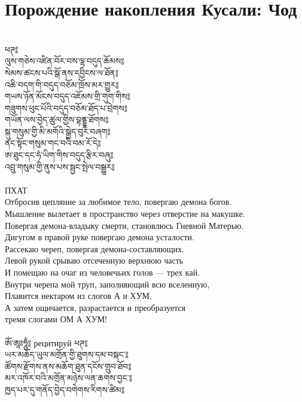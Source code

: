 \ru
\section{Порождение накопления Кусали: Чод}
\\
\ti
ཕཊ༔ \\
ལུས་གཅེས་འཛིན་བོར་བས་ལྷ་བདུད་ཆོམས༔\\
སེམས་ཚངས་པའི་སྒོ་ནས་དབྱིངས་ལ་ཐོན༔\\
འཆི་བདག་གི་བདུད་བཅོམ་ཁྲོས་མར་གྱུར༔\\
གཡས་ཉོན་མོངས་བདུད་འཇོམས་གྲི་གུག་གིས༔\\
གཟུགས་ཕུང་པོའི་བདུད་བཅོམ་ཐོད་པ་བྲེགས༔\\
གཡོན་ལས་བྱེད་ཚུལ་གྱིས་བྷནྡྷ་ཐོགས༔\\
སྐུ་གསུམ་གྱི་མི་མགོའི་སྒྱེད་བུར་བཞག༔\\
ནང་སྟོང་གསུམ་གང་བའི་བམ་རོ་དེ༔\\
ཨ་ཐུང་དང་ཧཾ་ཡིག་གིས་བདུད་རྩིར་བཞུ༔\\
འབྲུ་གསུམ་གྱི་ནུས་པས་སྦྱང་སྤེལ་བསྒྱུར༔\\
\\
\ru
ПХАТ\\
Отбросив цепляние за любимое тело, повергаю демона богов.\\
Мышление вылетает в пространство через отверстие на макушке.\\
Повергая демона-владыку смерти, становлюсь Гневной Матерью.\\
Дигугом в правой руке повергаю демона усталости.\\
Рассекаю череп, повергая демона-составляющих.\\
Левой рукой срываю отсеченную верхнюю часть\\
И помещаю на очаг из человечьих голов — трех кай.\\
Внутри черепа мой труп, заполняющий всю вселенную,\\
Плавится нектаром из слогов А и ХУМ,\\
А затем ощичается, разрастается и преобразуется\\
тремя слогами ОМ А ХУМ!\\
\\
\ti
ཨོཾ་ཨཱཿཧཱུྂ༔
\ru рецитируй
\newpage
\ti
ཕཊ༔\\
ཡར་མཆོད་ཡུལ་མགྲོན་གྱི་ཐུགས་དམ་བསྐང་༔\\
ཚོགས་རྫོགས་ནས་མཆོག་ཐུན་དངོས་གྲུབ་ཐོབ༔\\
མར་འཁོར་བའི་མགྲོན་མཉེས་ལན་ཆགས་བྱང་༔\\
ཁྱད་པར་དུ་གནོད་བྱེད་བགེགས་རིགས་ཚིམ༔\\
